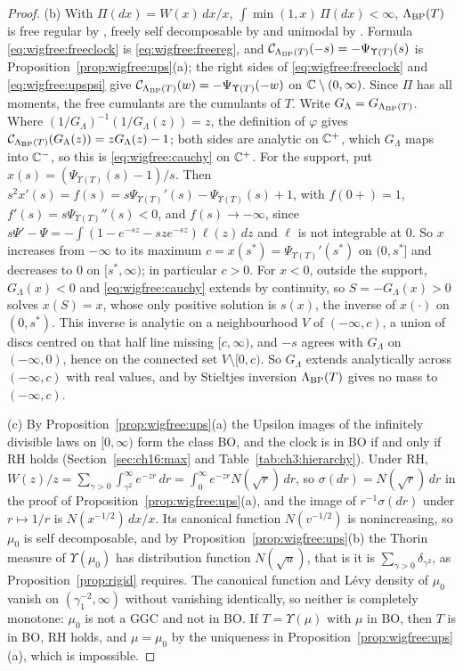 \begin{proof}
(b) With $\Pi(dx)=W(x)\,dx/x$, $\int\min(1,x)\,\Pi(dx)<\infty$, $\Lambda_{\rm BP}(T)$ is free regular by \cite[Theorem 9]{AHS13}, freely self decomposable by \cite{BNT02} and unimodal by \cite{HT16}. Formula \eqref{eq:wigfree:freeclock} is \eqref{eq:wigfree:freereg}, and $\mathcal C_{\Lambda_{\rm BP}(T)}(-s)=-\Psi_{\Upsilon(T)}(s)$ is Proposition~\ref{prop:wigfree:ups}(a); the right sides of \eqref{eq:wigfree:freeclock} and \eqref{eq:wigfree:upspsi} give $\mathcal C_{\Lambda_{\rm BP}(T)}(w)=-\Psi_{\Upsilon(T)}(-w)$ on $\mathbb{C}\setminus(0,\infty)$. Since $\Pi$ has all moments, the free cumulants are the cumulants of $T$. Write $G_\Lambda=G_{\Lambda_{\rm BP}(T)}$. Where $(1/G_\Lambda)^{-1}(1/G_\Lambda(z))=z$, the definition of $\varphi$ gives $\mathcal C_{\Lambda_{\rm BP}(T)}(G_\Lambda(z))=zG_\Lambda(z)-1$; both sides are analytic on $\mathbb{C}^+$, which $G_\Lambda$ maps into $\mathbb{C}^-$, so this is \eqref{eq:wigfree:cauchy} on $\mathbb{C}^+$. For the support, put $x(s)=(\Psi_{\Upsilon(T)}(s)-1)/s$. Then $s^2x'(s)=f(s)=s\Psi_{\Upsilon(T)}'(s)-\Psi_{\Upsilon(T)}(s)+1$, with $f(0+)=1$, $f'(s)=s\Psi_{\Upsilon(T)}''(s)<0$, and $f(s)\to-\infty$, since $s\Psi'-\Psi=-\int(1-e^{-sz}-sze^{-sz})\ell(z)\,dz$ and $\ell$ is not integrable at $0$. So $x$ increases from $-\infty$ to its maximum $c=x(s^*)=\Psi_{\Upsilon(T)}'(s^*)$ on $(0,s^*]$ and decreases to $0$ on $[s^*,\infty)$; in particular $c>0$. For $x<0$, outside the support, $G_\Lambda(x)<0$ and \eqref{eq:wigfree:cauchy} extends by continuity, so $S=-G_\Lambda(x)>0$ solves $x(S)=x$, whose only positive solution is $s(x)$, the inverse of $x(\cdot)$ on $(0,s^*)$. This inverse is analytic on a neighbourhood $V$ of $(-\infty,c)$, a union of discs centred on that half line missing $[c,\infty)$, and $-s$ agrees with $G_\Lambda$ on $(-\infty,0)$, hence on the connected set $V\setminus[0,c)$. So $G_\Lambda$ extends analytically across $(-\infty,c)$ with real values, and by Stieltjes inversion $\Lambda_{\rm BP}(T)$ gives no mass to $(-\infty,c)$.

(c) By Proposition~\ref{prop:wigfree:ups}(a) the Upsilon images of the infinitely divisible laws on $[0,\infty)$ form the class BO, and the clock is in BO if and only if RH holds (Section~\ref{sec:ch16:max} and Table~\ref{tab:ch3:hierarchy}). Under RH, $W(z)/z=\sum_{\gamma>0}\int_{\gamma^2}^\infty e^{-zr}\,dr=\int_0^\infty e^{-zr}N(\sqrt r)\,dr$, so $\sigma(dr)=N(\sqrt r)\,dr$ in the proof of Proposition~\ref{prop:wigfree:ups}(a), and the image of $r^{-1}\sigma(dr)$ under $r\mapsto1/r$ is $N(x^{-1/2})\,dx/x$. Its canonical function $N(v^{-1/2})$ is nonincreasing, so $\mu_0$ is self decomposable, and by Proposition~\ref{prop:wigfree:ups}(b) the Thorin measure of $\Upsilon(\mu_0)$ has distribution function $N(\sqrt u)$, that is it is $\sum_{\gamma>0}\delta_{\gamma^2}$, as Proposition~\ref{prop:rigid} requires. The canonical function and L\'evy density of $\mu_0$ vanish on $(\gamma_1^{-2},\infty)$ without vanishing identically, so neither is completely monotone: $\mu_0$ is not a GGC and not in BO. If $T=\Upsilon(\mu)$ with $\mu$ in BO, then $T$ is in BO, RH holds, and $\mu=\mu_0$ by the uniqueness in Proposition~\ref{prop:wigfree:ups}(a), which is impossible.
\end{proof}


